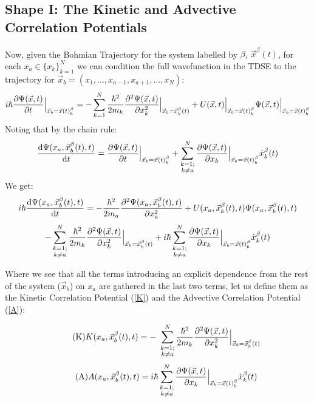 \documentclass[11pt, a4paper]{article} %
\begin{document}
\subsection{Shape I: The Kinetic and Advective Correlation Potentials}

Now, given the Bohmian Trajectory for the system labelled by $\beta$, $\vec{x}^\beta(t)$, for each $x_a\in\{x_k\}_{k=1}^N$ we can condition the full wavefunction in the TDSE to the trajectory for $\vec{x}_b=(x_1,...,x_{a-1},x_{a+1},...,x_N)$:
$$
i\hbar \pdv{\Psi(\vec{x}, t)}{t}\Big\rvert_{\vec{x}_b=\vec{x}(t)_b^\beta} = - \sum_{k=1}^{N} \frac{\hbar^2}{2m_k}\pdv[2]{\Psi(\vec{x},t)}{x_k}\Big\rvert_{\vec{x}_b=\vec{x}_b^\beta(t)} + U(\vec{x},t)\Big\rvert_{\vec{x}_b=\vec{x}(t)_b^\beta}\Psi(\vec{x},t)\Big\rvert_{\vec{x}_b=\vec{x}(t)_b^\beta}
$$
Noting that by the chain rule:
$$
\dv{\Psi(x_a, \vec{x}_b^\beta(t), t)}{t} = \pdv{\Psi(\vec{x}, t)}{t}\Big\rvert_{\vec{x}_b=\vec{x}(t)_b^\beta} + \sum_{\substack{k=1; \\ k\neq a}}^{N} \pdv{\Psi(\vec{x}, t)}{x_k}\Big\rvert_{\vec{x}_b=\vec{x}(t)_b^\beta} \dot{x}_k^\beta(t)
$$
We get:
$$
i\hbar \dv{\Psi(x_a, \vec{x}_b^\beta(t), t)}{t} = - \frac{\hbar^2}{2m_a}\pdv[2]{\Psi(x_a, \vec{x}_b^\beta(t), t)}{x_a} + U(x_a, \vec{x}_b^\beta(t), t)\Psi(x_a, \vec{x}_b^\beta(t), t) 
$$
$$
- \sum_{\substack{k=1; \\ k\neq a}}^{N} \frac{\hbar^2}{2m_k}\pdv[2]{\Psi(\vec{x},t)}{x_k}\Big\rvert_{\vec{x}_b=\vec{x}_b^\beta(t)} + i \hbar  \sum_{\substack{k=1; \\ k\neq a}}^{N} \pdv{\Psi(\vec{x}, t)}{x_k}\Big\rvert_{\vec{x}_b=\vec{x}(t)_b^\beta} \dot{x}_k^\beta(t)
$$

Where we see that all the terms introducing an explicit dependence from the rest of the system ($\vec{x}_b$) on $x_a$ are gathered in the last two terms, let us define them as the Kinetic Correlation Potential (\ref{K}) and the Advective Correlation Potential (\ref{A}):

\begin{equation}\label{K}\tag{K}
K(x_a, \vec{x}_b^\beta(t), t) = - \ \sum_{\substack{k=1; \\ k\neq a}}^{N} \frac{\hbar^2}{2m_k}\pdv[2]{\Psi(\vec{x},t)}{x_k}\Big\rvert_{\vec{x}_b=\vec{x}_b^\beta(t)}
\end{equation}
\begin{equation}\label{A}\tag{A}
A(x_a, \vec{x}_b^\beta(t), t) =  i \hbar  \sum_{\substack{k=1; \\ k\neq a}}^{N} \pdv{\Psi(\vec{x}, t)}{x_k}\Big\rvert_{\vec{x}_b=\vec{x}(t)_b^\beta} \dot{x}_k^\beta(t)
\end{equation}
\end{document}
